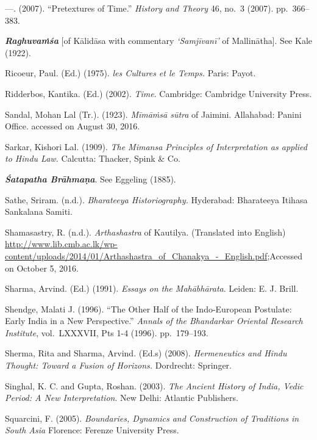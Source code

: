 \begin{thebibliography}{99}
  —. (2007). “Pretextures of Time.” \textit{History and Theory} 46, no.~3 (2007). pp.~366--383.

  \textbf{\textit{Raghuvaṁśa}} [of Kālidāsa with commentary \textit{‘Samjīvanī’} of Mallinātha]. See Kale (1922).

  Ricoeur, Paul. (Ed.) (1975). \textit{les Cultures et le Temps.} Paris: Payot.

  Ridderbos, Kantika. (Ed.) (2002). \textit{Time}. Cambridge: Cambridge University Press.

  Sandal, Mohan Lal (Tr.). (1923). \textit{Mīmāṁsā sūtra} of Jaimini. Allahabad: Panini Office. accessed on August 30, 2016.

  Sarkar, Kishori Lal. (1909). \textit{The Mimansa Principles of Interpretation as applied to Hindu Law.} Calcutta: Thacker, Spink \& Co. 

  \textbf{\textit{Śatapatha Brāhmaṇa}}. See Eggeling (1885).

  Sathe, Sriram. (n.d.). \textit{Bharateeya Historiography.} Hyderabad: Bharateeya Itihasa Sankalana Samiti.

  Shamasastry, R. (n.d.). \textit{Arthashastra} of Kautilya. (Translated into English) \url{http://www.lib.cmb.ac.lk/wp-content/uploads/2014/01/Arthashastra_of_Chanakya_-_English.pdf};\break Accessed on October 5, 2016.

  Sharma, Arvind. (Ed.) (1991). \textit{Essays on the Mahābhārata}. Leiden: E. J. Brill.

  Shendge, Malati J. (1996). “The Other Half of the Indo-European Postulate: Early India in a New Perspective.” \textit{Annals of the Bhandarkar Oriental Research Institute}, vol.~LXXXVII, Pts 1-4 (1996). pp.~179--193.

  Sherma, Rita and Sharma, Arvind. (Ed.s) (2008). \textit{Hermeneutics and Hindu Thought: Toward a Fusion of Horizons.} Dordrecht: Springer.

  Singhal, K. C. and Gupta, Roshan. (2003). \textit{The Ancient History of India, Vedic Period: A New Interpretation}. New Delhi: Atlantic Publishers.

  Squarcini, F. (2005). \textit{Boundaries, Dynamics and Construction of Traditions in South Asia} Florence: Ferenze University Press.


\end{thebibliography}
